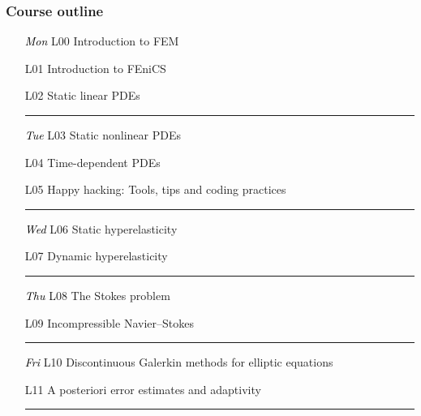 \documentclass{fenicscourse}
\begin{document}

\begin{frame}
  \frametitle{Course outline}



  \footnotesize

  \hspace{2cm}
  \begin{enumerate}
    \hrule
  \item[\textcolor{black}{\it Mon} L00]
    Introduction to FEM
  \item[L01]
    Introduction to FEniCS
  \item[L02]
    Static linear PDEs
    \\[0.5em]\hrule
  \item[\textcolor{black}{\it Tue} L03]
    Static nonlinear PDEs
  \item[L04]
    Time-dependent PDEs
  \item[L05]
    Happy hacking: Tools, tips and coding practices
    \\[0.5em]\hrule
  \item[\textcolor{black}{\it Wed} L06]
    Static hyperelasticity
  \item[L07]
    Dynamic hyperelasticity
    \\[0.5em]\hrule
  \item[\textcolor{black}{\it Thu} L08]
    The Stokes problem
  \item[L09]
    Incompressible Navier--Stokes
    \\[0.5em]\hrule
  \item[\textcolor{black}{\it Fri} L10]
    Discontinuous Galerkin methods for elliptic equations
  \item[L11]
    A posteriori error estimates and adaptivity
    \\[0.5em]\hrule
  \end{enumerate}


\end{frame}
\end{document}
